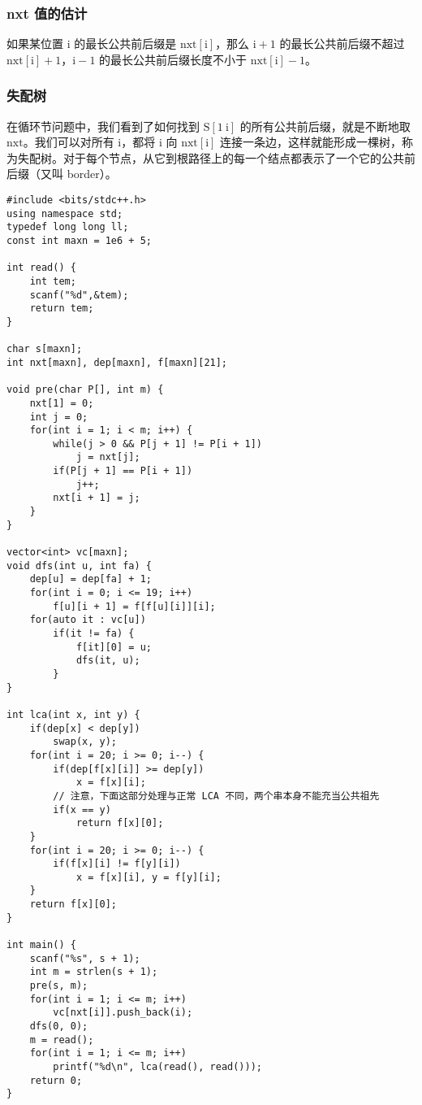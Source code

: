 \documentclass[UTF8]{article}
\begin{document}
\subsubsection{nxt 值的估计}
如果某位置 $\mathrm{i}$ 的最长公共前后缀是 $\mathrm{nxt[i]}$，那么 $\mathrm{i + 1}$ 的最长公共前后缀不超过 $\mathrm{nxt[i] + 1}$，$\mathrm{i - 1}$ 的最长公共前后缀长度不小于 $\mathrm{nxt[i] - 1}$。


\subsubsection{失配树}
在循环节问题中，我们看到了如何找到 $\mathrm{S[1 ~ i]}$ 的所有公共前后缀，就是不断地取 $\mathrm{nxt}$。我们可以对所有 $\mathrm{i}$，都将 $\mathrm{i}$ 向 $\mathrm{nxt[i]}$ 连接一条边，这样就能形成一棵树，称为失配树。对于每个节点，从它到根路径上的每一个结点都表示了一个它的公共前后缀（又叫 border）。

\begin{lstlisting}[caption=失配树]
#include <bits/stdc++.h>
using namespace std;
typedef long long ll;
const int maxn = 1e6 + 5;

int read() {
	int tem;
	scanf("%d",&tem);
	return tem;
}

char s[maxn];
int nxt[maxn], dep[maxn], f[maxn][21];

void pre(char P[], int m) {
	nxt[1] = 0;
	int j = 0;
	for(int i = 1; i < m; i++) {
		while(j > 0 && P[j + 1] != P[i + 1])
			j = nxt[j];
		if(P[j + 1] == P[i + 1])
			j++;
		nxt[i + 1] = j;
	}
}

vector<int> vc[maxn];
void dfs(int u, int fa) {
	dep[u] = dep[fa] + 1;
	for(int i = 0; i <= 19; i++)
		f[u][i + 1] = f[f[u][i]][i];
	for(auto it : vc[u]) 
		if(it != fa) {
			f[it][0] = u;
			dfs(it, u);
		}
}

int lca(int x, int y) {
	if(dep[x] < dep[y])
		swap(x, y);
	for(int i = 20; i >= 0; i--) {
		if(dep[f[x][i]] >= dep[y])
			x = f[x][i];
		// 注意，下面这部分处理与正常 LCA 不同，两个串本身不能充当公共祖先
		if(x == y)
			return f[x][0];
	}
	for(int i = 20; i >= 0; i--) {
		if(f[x][i] != f[y][i])
			x = f[x][i], y = f[y][i];
	}
	return f[x][0];
}

int main() {
	scanf("%s", s + 1);
	int m = strlen(s + 1);
	pre(s, m);
	for(int i = 1; i <= m; i++)
		vc[nxt[i]].push_back(i);
	dfs(0, 0);
	m = read();
	for(int i = 1; i <= m; i++)
		printf("%d\n", lca(read(), read()));
	return 0;
}
\end{lstlisting}
\end{document}
